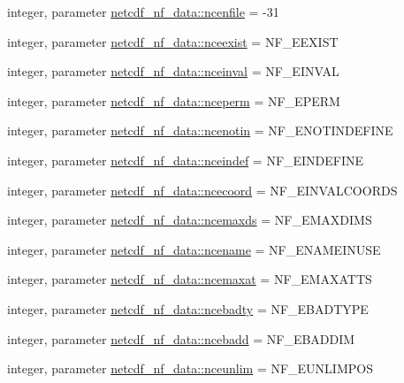 \begin{DoxyCompactItemize}
\item 
integer, parameter \hyperlink{namespacenetcdf__nf__data_a8df82c2d5df880f473778ae9ac3a5885}{netcdf\+\_\+nf\+\_\+data\+::ncenfile} = -\/31
\item 
integer, parameter \hyperlink{namespacenetcdf__nf__data_af4635532b17b950069faaae33b196fba}{netcdf\+\_\+nf\+\_\+data\+::nceexist} = N\+F\+\_\+\+E\+E\+X\+I\+ST
\item 
integer, parameter \hyperlink{namespacenetcdf__nf__data_a3a5571519fa1d0f18858874ecb7f7b33}{netcdf\+\_\+nf\+\_\+data\+::nceinval} = N\+F\+\_\+\+E\+I\+N\+V\+AL
\item 
integer, parameter \hyperlink{namespacenetcdf__nf__data_a2b1b6addf2f81da54af71f390068562a}{netcdf\+\_\+nf\+\_\+data\+::nceperm} = N\+F\+\_\+\+E\+P\+E\+RM
\item 
integer, parameter \hyperlink{namespacenetcdf__nf__data_a3f59b9d6d8fc5b25dfc8852d0fb82f72}{netcdf\+\_\+nf\+\_\+data\+::ncenotin} = N\+F\+\_\+\+E\+N\+O\+T\+I\+N\+D\+E\+F\+I\+NE
\item 
integer, parameter \hyperlink{namespacenetcdf__nf__data_a053b754902b374e4b3f4b03f38c19c8c}{netcdf\+\_\+nf\+\_\+data\+::nceindef} = N\+F\+\_\+\+E\+I\+N\+D\+E\+F\+I\+NE
\item 
integer, parameter \hyperlink{namespacenetcdf__nf__data_a4401a712be65d397ee27b7348a3e4ad8}{netcdf\+\_\+nf\+\_\+data\+::ncecoord} = N\+F\+\_\+\+E\+I\+N\+V\+A\+L\+C\+O\+O\+R\+DS
\item 
integer, parameter \hyperlink{namespacenetcdf__nf__data_a30bb2c6df61929c01a88049b1a88e01c}{netcdf\+\_\+nf\+\_\+data\+::ncemaxds} = N\+F\+\_\+\+E\+M\+A\+X\+D\+I\+MS
\item 
integer, parameter \hyperlink{namespacenetcdf__nf__data_ad87db061a8ccce892328e35e2e0b1ec1}{netcdf\+\_\+nf\+\_\+data\+::ncename} = N\+F\+\_\+\+E\+N\+A\+M\+E\+I\+N\+U\+SE
\item 
integer, parameter \hyperlink{namespacenetcdf__nf__data_a672787d382099c1a16156ef5df15d517}{netcdf\+\_\+nf\+\_\+data\+::ncemaxat} = N\+F\+\_\+\+E\+M\+A\+X\+A\+T\+TS
\item 
integer, parameter \hyperlink{namespacenetcdf__nf__data_a8d54e06d25b56b67e22147d96ed2ac66}{netcdf\+\_\+nf\+\_\+data\+::ncebadty} = N\+F\+\_\+\+E\+B\+A\+D\+T\+Y\+PE
\item 
integer, parameter \hyperlink{namespacenetcdf__nf__data_a0ccc9e2af8331c8d0c84d297a83a549e}{netcdf\+\_\+nf\+\_\+data\+::ncebadd} = N\+F\+\_\+\+E\+B\+A\+D\+D\+IM
\item 
integer, parameter \hyperlink{namespacenetcdf__nf__data_a9840acd59eabccbd513b901cc09b4503}{netcdf\+\_\+nf\+\_\+data\+::nceunlim} = N\+F\+\_\+\+E\+U\+N\+L\+I\+M\+P\+OS

\end{DoxyCompactItemize}
